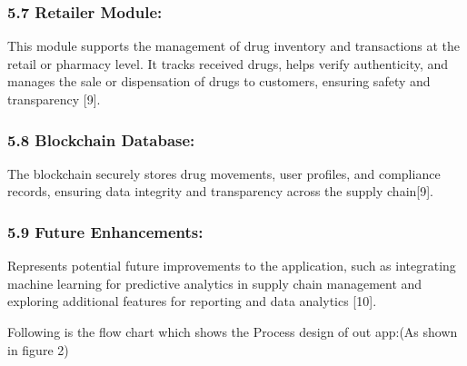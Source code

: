 \documentclass[runningheads]{llncs}
\begin{document}
\subsubsection{5.7 Retailer Module:} This module supports the management of drug inventory and transactions at the retail or pharmacy level. It tracks received drugs, helps verify authenticity, and manages the sale or dispensation of drugs to customers, ensuring safety and transparency [9].

\subsubsection{5.8 Blockchain Database:} The blockchain securely stores drug movements, user profiles, and compliance records, ensuring data integrity and transparency across the supply chain[9].

\subsubsection{5.9 Future Enhancements:} Represents potential future improvements to the application, such as integrating machine learning for predictive analytics in supply chain management and exploring additional features for reporting and data analytics  [10].


Following is the flow chart which shows the Process design of out
app:(As shown in figure 2)
\end{document}
